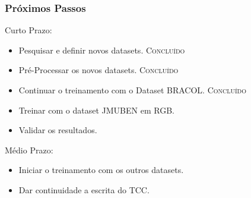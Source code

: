 \documentclass[aspectratio=169]{beamer}
\begin{document}
\begin{frame}
    \frametitle{Próximos Passos}

    \begin{block}{Curto Prazo:}

        \begin{itemize}
            \item Pesquisar e definir novos datasets. \textsc{Concluído}
            \item Pré-Processar os novos datasets. \textsc{Concluído}
            \item Continuar o treinamento com o Dataset BRACOL.  \textsc{Concluído}
            \item \color{blue} Treinar com o dataset JMUBEN em RGB.
            \item \color{blue} Validar os resultados.
        \end{itemize}

    \end{block}



    \begin{block}{Médio Prazo:}

        \begin{itemize}
            \item \color{blue} Iniciar o treinamento com os outros datasets.
            \item \color{blue} Dar continuidade a escrita do TCC.
        \end{itemize}

    \end{block}




\end{frame}



\end{document}
